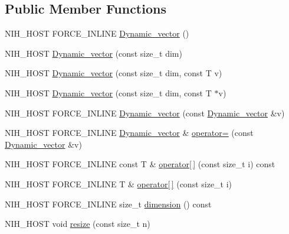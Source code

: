 \subsection*{\-Public \-Member \-Functions}
\begin{DoxyCompactItemize}
\item 
\-N\-I\-H\-\_\-\-H\-O\-S\-T \-F\-O\-R\-C\-E\-\_\-\-I\-N\-L\-I\-N\-E \hyperlink{structnih_1_1_dynamic__vector_a78352151ab2fec1cec4024ee211454a9}{\-Dynamic\-\_\-vector} ()
\item 
\-N\-I\-H\-\_\-\-H\-O\-S\-T \hyperlink{structnih_1_1_dynamic__vector_a434b9fa69facf06fb9122a059461c000}{\-Dynamic\-\_\-vector} (const size\-\_\-t dim)
\item 
\-N\-I\-H\-\_\-\-H\-O\-S\-T \hyperlink{structnih_1_1_dynamic__vector_a980af6ce6af2d60e65878638c6da5d51}{\-Dynamic\-\_\-vector} (const size\-\_\-t dim, const \-T v)
\item 
\-N\-I\-H\-\_\-\-H\-O\-S\-T \hyperlink{structnih_1_1_dynamic__vector_a6d43a42828024ae13a6e07387a45c6de}{\-Dynamic\-\_\-vector} (const size\-\_\-t dim, const \-T $\ast$v)
\item 
\-N\-I\-H\-\_\-\-H\-O\-S\-T \-F\-O\-R\-C\-E\-\_\-\-I\-N\-L\-I\-N\-E \hyperlink{structnih_1_1_dynamic__vector_a489efffc6e5af45d78277bfdd9e4e0f0}{\-Dynamic\-\_\-vector} (const \hyperlink{structnih_1_1_dynamic__vector}{\-Dynamic\-\_\-vector} \&v)
\item 
\-N\-I\-H\-\_\-\-H\-O\-S\-T \-F\-O\-R\-C\-E\-\_\-\-I\-N\-L\-I\-N\-E \*
\hyperlink{structnih_1_1_dynamic__vector}{\-Dynamic\-\_\-vector} \& \hyperlink{structnih_1_1_dynamic__vector_a767e2ada4f59a2109a8a09fa2e46565f}{operator=} (const \hyperlink{structnih_1_1_dynamic__vector}{\-Dynamic\-\_\-vector} \&v)
\item 
\-N\-I\-H\-\_\-\-H\-O\-S\-T \-F\-O\-R\-C\-E\-\_\-\-I\-N\-L\-I\-N\-E const \-T \& \hyperlink{structnih_1_1_dynamic__vector_a747ac892d8de76ec66ab438bd0b2d750}{operator\mbox{[}$\,$\mbox{]}} (const size\-\_\-t i) const 
\item 
\-N\-I\-H\-\_\-\-H\-O\-S\-T \-F\-O\-R\-C\-E\-\_\-\-I\-N\-L\-I\-N\-E \-T \& \hyperlink{structnih_1_1_dynamic__vector_a0a296aca69ad2bf09ced18704de786f5}{operator\mbox{[}$\,$\mbox{]}} (const size\-\_\-t i)
\item 
\-N\-I\-H\-\_\-\-H\-O\-S\-T \-F\-O\-R\-C\-E\-\_\-\-I\-N\-L\-I\-N\-E size\-\_\-t \hyperlink{structnih_1_1_dynamic__vector_a91342bd1d155e5863091fa57380604b9}{dimension} () const 
\item 
\-N\-I\-H\-\_\-\-H\-O\-S\-T void \hyperlink{structnih_1_1_dynamic__vector_a25911ca1ee9497526cd97c6736adb6b1}{resize} (const size\-\_\-t n)
\end{DoxyCompactItemize}
